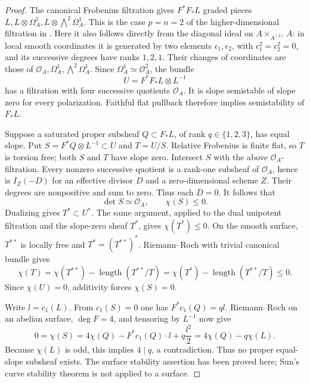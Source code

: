 \begin{proof}
The canonical Frobenius filtration gives \(F^*F_*L\) graded
pieces \(L,L\otimes\Omega_A^1,L\otimes\bigwedge^2\Omega_A^1\).
This is the case \(p=n=2\) of the higher-dimensional filtration
in \citep[Definition~3.1, Lemmas~3.2--3.5 and Theorem~3.6,
pp.~5--9]{Sun2006FrobeniusFiltration}.
Here it also follows directly from the diagonal ideal on
\(A\times_{A^{(2)}}A\): in local smooth coordinates it is
generated by two elements \(\epsilon_1,\epsilon_2\), with
\(\epsilon_1^2=\epsilon_2^2=0\), and its successive degrees
have ranks \(1,2,1\). Their changes of coordinates are those
of \(\mathcal O_A,\Omega_A^1,\bigwedge^2\Omega_A^1\).
Since \(\Omega_A^1\simeq\mathcal O_A^2\), the bundle
\[
                U=F^*F_*L\otimes L^{-1}                 \tag{DE-P13.1}
\]
has a filtration with four successive quotients \(\mathcal O_A\).
It is slope semistable of slope zero for every polarization.
Faithful flat pullback therefore implies semistability of \(F_*L\).

Suppose a saturated proper subsheaf \(Q\subset F_*L\), of
rank \(q\in\{1,2,3\}\), has equal slope. Put
\(S=F^*Q\otimes L^{-1}\subset U\) and \(T=U/S\).
Relative Frobenius is finite flat, so \(T\) is torsion free;
both \(S\) and \(T\) have slope zero.
Intersect \(S\) with the above \(\mathcal O_A\)-filtration.
Every nonzero successive quotient is a rank-one subsheaf of
\(\mathcal O_A\), hence is \(I_Z(-D)\) for an effective
divisor \(D\) and a zero-dimensional scheme \(Z\).
Their degrees are nonpositive and sum to zero. Thus each \(D=0\).
It follows that
\[
                   \det S\simeq\mathcal O_A,
                   \qquad \chi(S)\le0.                \tag{DE-P13.2}
\]
Dualizing gives \(T^*\subset U^*\). The same argument, applied
to the dual unipotent filtration and the slope-zero sheaf \(T^*\),
gives \(\chi(T^*)\le0\). On the smooth surface, \(T^{**}\)
is locally free and \(T^*=(T^{**})^*\). Riemann--Roch with
trivial canonical bundle gives
\[
 \chi(T)=\chi(T^{**})-\operatorname{length}(T^{**}/T)
        =\chi(T^*)-\operatorname{length}(T^{**}/T)\le0.
\]
Since \(\chi(U)=0\), additivity forces \(\chi(S)=0\).

Write \(l=c_1(L)\). From \(c_1(S)=0\) one has
\(F^*c_1(Q)=q l\). Riemann--Roch on an abelian surface,
\(\deg F=4\), and tensoring by \(L^{-1}\) now give
\[
 0=\chi(S)=4\chi(Q)-F^*c_1(Q)\cdot l+q\frac{l^2}{2}
          =4\chi(Q)-q\chi(L).                        \tag{DE-P13.3}
\]
Because \(\chi(L)\) is odd, this implies \(4\mid q\), a
contradiction. Thus no proper equal-slope subsheaf exists.
The surface stability assertion has been proved here; Sun's
curve stability theorem is not applied to a surface.
\end{proof}

